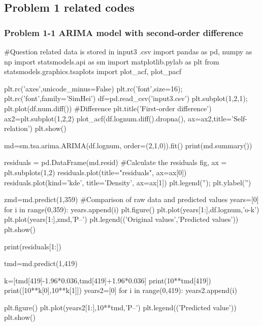 \documentclass[12pt]{article}
\begin{document}
\subsection{Problem 1 related codes}
\subsubsection*{Problem 1-1 ARIMA model with second-order difference}
\newpage
\begin{python}
#Question related data is stored in input3 .csv
    import pandas as pd, numpy as np
    import statsmodels.api as sm
    import matplotlib.pylab as plt
    from statsmodels.graphics.tsaplots import plot_acf, plot_pacf

    plt.rc('axes',unicode_minus=False)
    plt.rc('font',size=16); plt.rc('font',family='SimHei')
    df=pd.read_csv('input3.csv')
    plt.subplot(1,2,1); plt.plot(df.num.diff()) #Difference
    plt.title('First-order difference')
    ax2=plt.subplot(1,2,2)
    plot_acf(df.lognum.diff().dropna(), ax=ax2,title='Self-relation') 
    plt.show()

    md=sm.tsa.arima.ARIMA(df.lognum, order=(2,1,0)).fit()
    print(md.summary())

    residuals = pd.DataFrame(md.resid) #Calculate the residuals
    fig, ax = plt.subplots(1,2)
    residuals.plot(title="residuals", ax=ax[0])
    residuals.plot(kind='kde', title='Density', ax=ax[1])
    plt.legend(''); plt.ylabel('')          

    zmd=md.predict(1,359)  #Comparison of raw data and predicted values
    years=[0]
    for i in range(0,359):
        years.append(i)
    plt.figure()
    plt.plot(years[1:],df.lognum,'o-k')
    plt.plot(years[1:],zmd,'P--')
    plt.legend(('Original values','Predicted values'))
    plt.show()

    print(residuals[1:])
      
    tmd=md.predict(1,419)

    k=[tmd[419]-1.96*0.036,tmd[419]+1.96*0.036]
    print(10**tmd[419])
    print([10**k[0],10**k[1]])
    years2=[0]
    for i in range(0,419):
        years2.append(i)

    plt.figure()
    plt.plot(years2[1:],10**tmd,'P--')
    plt.legend(('Predicted value'))
    plt.show()
\end{python}
\end{document}
